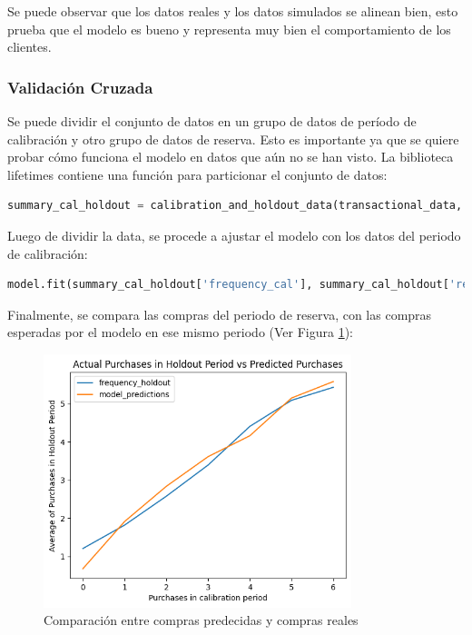Se puede observar que los datos reales y los datos simulados se alinean bien, esto prueba que el modelo es bueno y representa muy bien el comportamiento de los clientes.

\subsubsection{Validación Cruzada}

Se puede dividir el conjunto de datos en un grupo de datos de período de calibración y otro grupo de datos de reserva. Esto es importante ya que se quiere probar cómo funciona el modelo en datos que aún no se han visto. La biblioteca lifetimes contiene una función para particionar el conjunto de datos:

\begin{lstlisting}[language=Python, caption=Validación en modelo.ipynb]
summary_cal_holdout = calibration_and_holdout_data(transactional_data, 'CustomerNo', 'Date',                                            calibration_period_end='2019-06-09', observation_period_end='2019-12-09')
\end{lstlisting}

Luego de dividir la data, se procede a ajustar el modelo con los datos del periodo de calibración:

\begin{lstlisting}[language=Python, caption=Validación en modelo.ipynb]
model.fit(summary_cal_holdout['frequency_cal'], summary_cal_holdout['recency_cal'], summary_cal_holdout['T_cal'])
\end{lstlisting}

Finalmente, se compara las compras del periodo de reserva, con las compras esperadas por el modelo en ese mismo periodo (Ver Figura \ref{fig:comp}):

\begin{figure}[H]
	\centering \includegraphics[width=0.80\textwidth]{images/comparacion.png}
	\caption{Comparación entre compras predecidas y compras reales}
	\label{fig:comp}
\end{figure}

